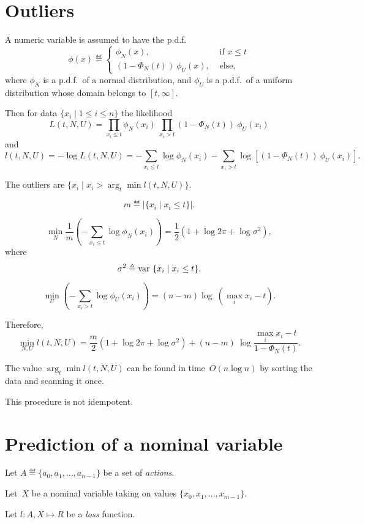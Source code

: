 \documentclass[10pt,a4paper]{article}
\theoremstyle{plain} \newtheorem{Lem}{Lemma}
\begin{document}
\section{Outliers}

A numeric variable is assumed to have the p.d.f.
\begin{equation*}
  \phi(x) \eqdef
    \begin{cases}
       \phi_N(x), &\text{ if } x \le t\\
       (1 - \Phi_N(t)) \ \phi_U(x),   &\text{ else,}
     \end{cases}
\end{equation*}
where $\phi_N$ is a p.d.f.~of a normal distribution,
and $\phi_U$ is a p.d.f.~of a uniform distribution whose domain belongs to $[t,\infty]$.

Then for data $\{x_i \mid 1 \le i \le n\}$
the likelihood
$$ L(t,N,U) = \prod_{x_i \le t} \phi_N(x_i) \ \prod_{x_i > t} (1 - \Phi_N(t)) \ \phi_U(x_i) $$
and
$$ l(t,N,U) = - \log L(t,N,U) = -\sum_{x_i \le t} \log \phi_N(x_i) - \sum_{x_i > t} \log [(1 - \Phi_N(t)) \ \phi_U(x_i)]. $$

The outliers are $\{x_i \mid x_i > \arg_t \min l(t,N,U)\}$.

$$ m \eqdef |\{x_i \mid x_i \le t\}|. $$

$$ \min_N \frac 1 m \left(- \sum_{x_i \le t} \log \phi_N(x_i) \right) = \frac 1 2 \left(1 + \log 2 \pi + \log \sigma^2 \right), $$
where
$$ \sigma^2 \triangleq \mathrm {var} \  \{x_i \mid x_i \le t\}. $$

$$ \min_U \left(- \sum_{x_i > t} \log \phi_U(x_i) \right) = (n - m) \log \ (\max_i x_i - t). $$

Therefore,
$$ \min_{N,U} l(t,N,U) = \frac m 2 \left(1 + \log 2 \pi + \log \sigma^2 \right) + (n - m) \ \log \frac {\max_i x_i - t} {1 - \Phi_N(t)}. $$

The value $\arg_t \min l(t,N,U)$ can be found in time~$O(n \log n)$ by sorting the data and scanning it once.

This procedure is not idempotent.


\section {Prediction of a nominal variable}
Let $A \eqdef \{a_0, a_1, \dots, a_{n-1}\}$ be a set of {\em actions}.

Let~$X$ be a nominal variable taking on values $\{x_0, x_1, \dots, x_{m-1}\}$.

Let $l: A, X \mapsto R$ be a {\em loss} function.
\end{document}

